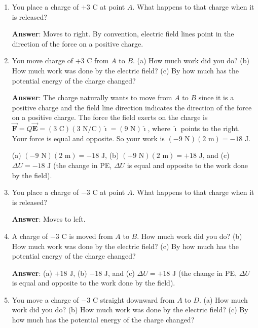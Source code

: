 \documentclass{article}
\newcommand{\ihat}[0]{\hat{\boldsymbol{\imath}}}
\newcommand{\bfvec}[1]{\vec{\mathbf{#1}}}
\begin{document}
\begin{enumerate}

  \item You place a charge of $+3\text{ C}$ at point $A$. What happens to that charge when it is released?

        \ifsolutions
          \textbf{Answer}: Moves to right. By convention, electric field lines point in the direction of the force on a positive charge.
        \fi

  \item You move charge of $+3\text{ C}$ from $A$ to $B$. (a) How much work did you do? (b) How much work was done by the electric field? (c) By how much has the potential energy of the charge changed?

        \ifsolutions
          \textbf{Answer}: The charge naturally wants to move from $A$ to $B$ since it is a positive charge and the field line direction indicates the direction of the force on a positive charge. The force the field exerts on the charge is $\bfvec{F}=Q\bfvec{E}=(3\text{ C})(3\text { N/C})\ihat = (9\text{ N})\ihat$, where $\ihat$ points to the right. Your force is equal and opposite. So your work is $(-9\text{ N})(2\text{ m}) = -18 \text{ J}$.
        
          (a) $(-9 \text{ N})(2\text { m})=-18\text{ J}$, (b) $(+9 \text{ N})(2\text { m})=+18\text{ J}$, and (c) $\Delta U = -18\text{ J}$ (the change in PE, $\Delta U$ is equal and opposite to the work done by the field).
        \fi

  \item You place a charge of $-3\text{ C}$ at point $A$. What happens to that charge when it is released?

        \ifsolutions
          \textbf{Answer}: Moves to left.
        \fi

  \item A charge of $-3\text{ C}$ is moved from $A$ to $B$. How much work did you do? (b) How much work was done by the electric field? (c) By how much has the potential energy of the charge changed?

        \ifsolutions
          \textbf{Answer}: (a) $+18\text{ J}$, (b) $-18\text{ J}$, and (c) $\Delta U = +18\text{ J}$ (the change in PE, $\Delta U$ is equal and opposite to the work done by the field).
        \fi

  \item You move a charge of $-3\text{ C}$ straight downward from $A$ to $D$. (a) How much work did you do? (b) How much work was done by the electric field? (c) By how much has the potential energy of the charge changed?


\end{enumerate}
\end{document}
